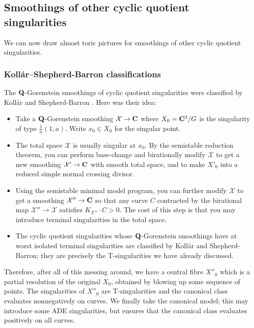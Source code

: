 \documentclass{article}
\begin{document}
\subsection{Smoothings of other cyclic quotient singularities}
\label{sct:ksb}


We can now draw almost toric pictures for smoothings of other cyclic
quotient singularities.


\subsubsection{Koll\'{a}r--Shepherd-Barron classifications}


The \(\mathbf{Q}\)-Gorenstein smoothings of cyclic quotient singularities
were classified by Koll\'{a}r and Shepherd-Barron \cite{KSB}. Here was
their idea:
\begin{itemize}
\item Take a \(\mathbf{Q}\)-Gorenstein smoothing \(\mathcal{X}\to\mathbf{C}\) where
\(X_0=\mathbf{C}^2/G\) is the singularity of type
\(\frac{1}{n}(1,a)\). Write \(x_0\in X_0\) for the singular point.
\item The total space \(\mathcal{X}\) is usually singular at \(x_0\). By
the semistable reduction theorem, you can perform base-change and
birationally modify \(\mathcal{X}\) to get a new smoothing
\(\mathcal{X}'\to\mathbf{C}\) with smooth total space, and to make \(X'_0\)
into a reduced simple normal crossing divisor.
\item Using the semistable minimal model program, you can further modify
\(\mathcal{X}\) to get a smoothing \(\mathcal{X}''\to\mathbf{C}\) so that
any curve \(C\) contracted by the birational map
\(\mathcal{X}''\to\mathcal{X}\) satisfies \(K_{\mathcal{X}''}\cdot
C>0\). The cost of this step is that you may introduce terminal
singularities in the total space.
\item The cyclic quotient singularities whose \(\mathbf{Q}\)-Gorenstein
smoothings have at worst isolated terminal singularities are
classified by Koll\'{a}r and Shepherd-Barron; they are precisely the
T-singularities we have already discussed.
\end{itemize}
Therefore, after all of this messing around, we have a central fibre
\(X''_0\) which is a partial resolution of the original \(X_0\),
obtained by blowing up some sequence of points. The singularities of
\(X''_0\) are T-singularities and the canonical class evaluates
nonnegatively on curves. We finally take the canonical model; this may
introduce some ADE singularities, but ensures that the canonical class
evaluates positively on all curves.
\end{document}
